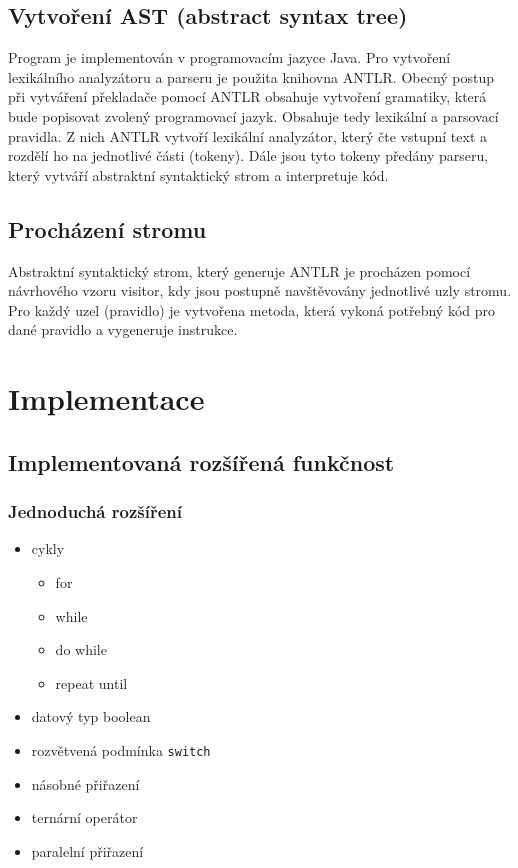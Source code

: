 \documentclass{style}
\begin{document}
\begin{itemize}
\end{itemize}

\section{Vytvoření AST (abstract syntax tree)}
Program je implementován v programovacím jazyce Java. Pro vytvoření lexikálního analyzátoru a parseru je použita knihovna ANTLR. Obecný postup při vytváření překladače pomocí ANTLR obsahuje vytvoření gramatiky, která bude popisovat zvolený programovací jazyk. Obsahuje tedy lexikální a parsovací pravidla. Z nich ANTLR vytvoří lexikální analyzátor, který čte vstupní text a rozdělí ho na jednotlivé části (tokeny). Dále jsou tyto tokeny předány parseru, který vytváří abstraktní syntaktický strom a interpretuje kód.

\section{Procházení stromu}
Abstraktní syntaktický strom, který generuje ANTLR je procházen pomocí návrhového vzoru visitor, kdy jsou postupně navštěvovány jednotlivé uzly stromu. Pro každý uzel (pravidlo) je vytvořena metoda, která vykoná potřebný kód pro dané pravidlo a vygeneruje instrukce.

\chapter{Implementace}

\section{Implementovaná rozšířená funkčnost}
\subsection{Jednoduchá rozšíření}
\begin{itemize}
\item cykly \\
\begin{itemize}
\item for \\
\item while \\
\item do while \\
\item repeat until \\
\end{itemize}
\item datový typ boolean \\
\item rozvětvená podmínka \verb|switch| \\
\item násobné přiřazení \\
\item ternární operátor \\
\item paralelní přiřazení \\
\end{itemize}
\end{document}
